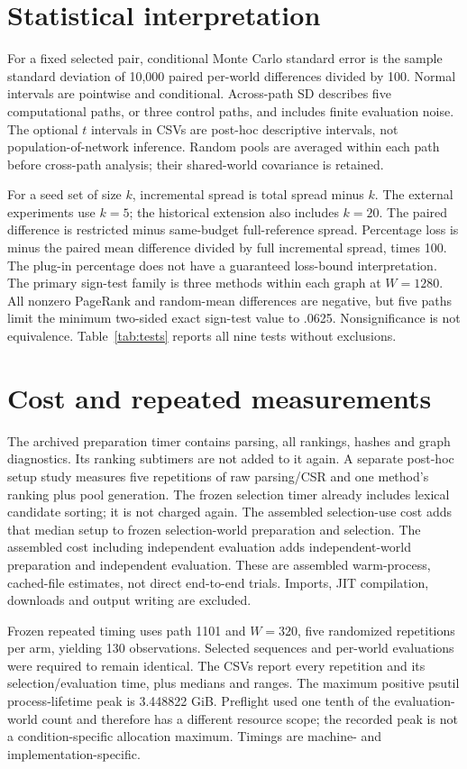 \documentclass[smallextended]{svjour3}
\begin{document}
\section{Statistical interpretation}
For a fixed selected pair, conditional Monte Carlo standard error is the sample
standard deviation of 10,000 paired per-world differences divided by 100.
Normal intervals are pointwise and conditional. Across-path SD describes five
computational paths, or three control paths, and includes finite evaluation noise.
The optional $t$ intervals in CSVs are post-hoc descriptive intervals, not
population-of-network inference. Random pools are averaged within each path
before cross-path analysis; their shared-world covariance is retained.

For a seed set of size $k$, incremental spread is total spread minus $k$.
The external experiments use $k=5$; the historical extension also includes $k=20$.
The paired difference is restricted minus same-budget full-reference spread. Percentage loss is
minus the paired mean difference divided by full incremental spread, times 100.
The plug-in percentage does not have a guaranteed loss-bound interpretation.
The primary sign-test family is three methods within each graph at $W=1280$.
All nonzero PageRank and random-mean differences are negative, but five paths
limit the minimum two-sided exact sign-test value to .0625. Nonsignificance is
not equivalence. Table~\ref{tab:tests} reports all nine tests without exclusions.

\section{Cost and repeated measurements}
The archived preparation timer contains parsing, all rankings, hashes and graph
diagnostics. Its ranking subtimers are not added to it again. A separate
post-hoc setup study measures five repetitions of raw parsing/CSR and one
method's ranking plus pool generation. The frozen selection timer already includes
lexical candidate sorting; it is not charged again. The assembled selection-use cost adds that
median setup to frozen selection-world preparation and selection. The assembled cost including independent evaluation adds independent-world preparation and independent evaluation.
These are assembled warm-process, cached-file estimates, not direct end-to-end
trials. Imports, JIT compilation, downloads and output writing are excluded.

Frozen repeated timing uses path 1101 and $W=320$, five randomized repetitions
per arm, yielding 130 observations. Selected sequences and per-world evaluations
were required to remain identical. The CSVs report every repetition and its
selection/evaluation time, plus medians and ranges. The maximum positive psutil process-lifetime peak is 3.448822 GiB. Preflight
used one tenth of the evaluation-world count and therefore has a different
resource scope; the recorded peak is not a condition-specific allocation maximum. Timings are machine- and implementation-specific.
\end{document}
